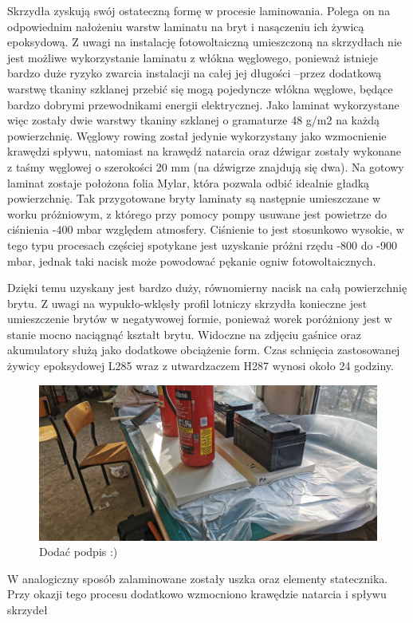 \documentclass[12pt, a4paper]{article}
\begin{document}
Skrzydła zyskują swój ostateczną formę w procesie laminowania. Polega on na odpowiednim nałożeniu warstw laminatu na bryt i nasączeniu ich żywicą epoksydową. Z uwagi na instalację fotowoltaiczną umieszczoną na skrzydłach nie jest możliwe wykorzystanie laminatu z włókna węglowego, ponieważ istnieje bardzo duże ryzyko zwarcia instalacji na całej jej długości –przez dodatkową warstwę tkaniny szklanej przebić się mogą  pojedyncze włókna węglowe, będące bardzo dobrymi przewodnikami energii elektrycznej. Jako laminat wykorzystane więc zostały dwie warstwy tkaniny szklanej o gramaturze 48 g/m2 na każdą powierzchnię. Węglowy rowing został jedynie wykorzystany jako wzmocnienie krawędzi spływu, natomiast na krawędź natarcia oraz dźwigar zostały wykonane z taśmy węglowej o szerokości 20 mm (na dźwigrze znajdują się dwa). Na gotowy laminat zostaje położona folia Mylar, która pozwala odbić idealnie gładką powierzchnię. Tak przygotowane bryty laminaty są następnie umieszczane w worku próżniowym, z którego przy pomocy pompy usuwane jest powietrze do ciśnienia -400 mbar względem atmosfery. Ciśnienie to jest stosunkowo wysokie, w tego typu procesach częściej spotykane jest uzyskanie próżni rzędu -800 do -900 mbar, jednak taki nacisk może powodować pękanie ogniw fotowoltaicznych.

Dzięki temu uzyskany jest bardzo duży, równomierny nacisk na całą powierzchnię brytu. Z uwagi na wypukło-wklęsły profil lotniczy skrzydła konieczne jest umieszczenie brytów w negatywowej formie, ponieważ worek poróżniony jest w stanie mocno naciągnąć kształt brytu. Widoczne na zdjęciu gaśnice oraz akumulatory służą jako dodatkowe obciążenie form. Czas schnięcia zastosowanej żywicy epoksydowej L285 wraz z utwardzaczem H287 wynosi około 24 godziny.
 \begin{figure}[ht]
    \centering
    \includegraphics[width=1\textwidth]{budowa9}
    \caption{Dodać podpis :)}
\end{figure}
W analogiczny sposób zalaminowane zostały uszka oraz elementy statecznika. Przy okazji tego procesu dodatkowo wzmocniono krawędzie natarcia i spływu skrzydeł
\end{document}

